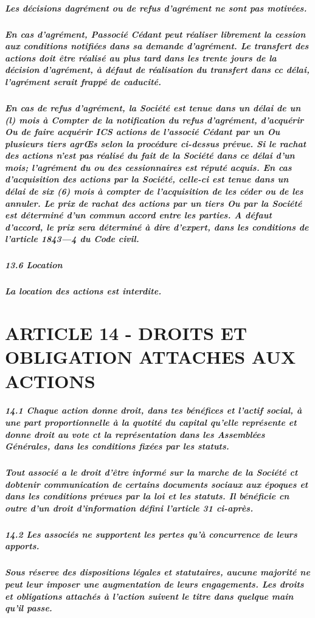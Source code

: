 \documentclass[a4paper, 11pt]{article}
\begin{document}
\subparagraph{
  Les décisions dagrément ou de refus d'agrément ne sont pas motivées.
}

\subparagraph{
  En cas d'agrément, Passocié Cédant peut réaliser librement la cession aux conditions notifiées dans sa demande d'agrément. Le transfert des actions doit être réalisé au plus tard dans les trente jours de la décision d'agrément, à défaut de réalisation du transfert dans cc délai, l'agrément serait frappé de caducité.
}

\subparagraph{
  En cas de refus d'agrément, la Société est tenue dans un délai de un (l) mois à Compter de la notification du refus d'agrément, d'acquérir Ou de faire acquérir ICS actions de l'associé Cédant par un Ou plusieurs tiers agrŒs selon la procédure ci-dessus prévue.
  Si le rachat des actions n'est pas réalisé du fait de la Société dans ce délai d'un mois; l'agrément du ou des cessionnaires est réputé acquis.
  En cas d'acquisition des actions par la Société, celle-ci est tenue dans un délai de six (6) mois à compter de l'acquisition de les céder ou de les annuler.
  Le prix de rachat des actions par un tiers Ou par la Société est déterminé d'un commun accord entre les parties. A défaut d'accord, le prix sera déterminé à dire d'expert, dans les conditions de l'article 1843—4 du Code civil.
}

\subparagraph{
  13.6 Location
}

\subparagraph{
  La location des actions est interdite.
}

\section*{ARTICLE 14 - DROITS ET OBLIGATION ATTACHES AUX ACTIONS}


\subparagraph{
  14.1 Chaque action donne droit, dans tes bénéfices et l'actif social, à une part proportionnelle à la quotité du capital qu'elle représente et donne droit au vote ct la représentation dans les Assemblées Générales, dans les conditions fixées par les statuts.
}

\subparagraph{
  Tout associé a le droit d'être informé sur la marche de la Société ct dobtenir communication de certains documents sociaux aux époques et dans les conditions prévues par la loi et les statuts. Il bénéficie cn outre d'un droit d'information défini l'article 31 ci-après.
}

\subparagraph{
  14.2 Les associés ne supportent les pertes qu'à concurrence de leurs apports.
}

\subparagraph{
  Sous réserve des dispositions légales et statutaires, aucune majorité ne peut leur imposer une augmentation de leurs engagements. Les droits et obligations attachés à l'action suivent le titre dans quelque main qu'il passe.
}
\end{document}
